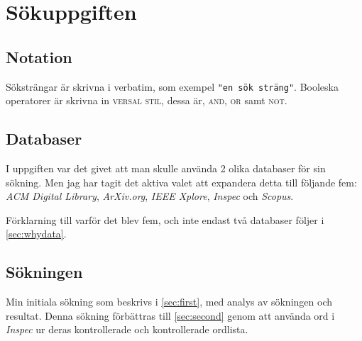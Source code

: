 \documentclass[a4paper,11pt,exjobb]{kth-mag}
\title{\thetitle}
\subtitle{*kryptovalutor är fullt digitala valutor som förlitar sig på kryptografi för att skapas och administreras. Största och mest kända heter Bitcoin (\textbaht, BTC, XBT).}
\author{Petter Salminen}
\date{\today}
\begin{document}
\frontmatter
\maketitle


%

\clearpage
%

%
%
%

\clearpage
\tableofcontents
\newpage

\mainmatter
\pagestyle{plain}
\chapter{Sökuppgiften}
\section{Notation}

Söksträngar är skrivna i verbatim, som exempel \verb="en sök sträng"=. Booleska operatorer är skrivna in \textsc{versal stil}, dessa är, \textsc{and}, \textsc{or} samt \textsc{not}.

\section{Databaser}
I uppgiften var det givet att man skulle använda 2 olika databaser för sin sökning. Men jag har tagit det aktiva valet att expandera detta till följande fem:
\textit{ACM Digital Library}\cite{ACM}, \textit{ArXiv.org}\cite{arxiv}, \textit{IEEE Xplore}\cite{IEEE}, \textit{Inspec}\cite{inspec} och \textit{Scopus}\cite{scopus}.

Förklarning till varför det blev fem, och inte endast två databaser följer i \ref{sec:whydata}.

\section{Sökningen}
Min initiala sökning som beskrivs i \ref{sec:first}, med analys av sökningen och resultat. Denna sökning förbättras till \ref{sec:second} genom att använda ord i \textit{Inspec} ur deras kontrollerade och kontrollerade ordlista.
\end{document}
